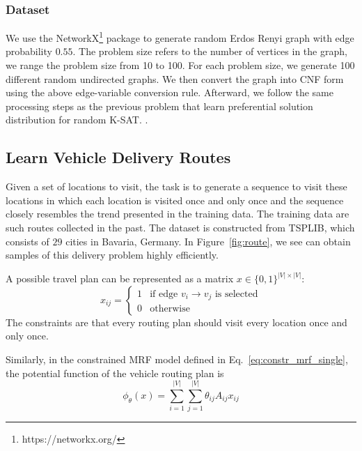 \subsubsection{Dataset} {We use the NetworkX\footnote{https://networkx.org/} package to generate random Erdos Renyi graph with edge probability $0.55$. The problem size refers to the number of vertices in the graph, we range the problem size from 10 to 100. For each problem size, we generate 100 different random undirected graphs. We then convert the graph into CNF form using the above edge-variable conversion rule. Afterward, we follow the same processing steps as the previous problem that learn preferential solution distribution for random K-SAT. }.


\subsection{Learn Vehicle Delivery Routes}
Given a set of locations to visit, the task is to generate a sequence to visit these locations in which each location is visited once and only once and the sequence closely resembles the trend presented in the training data.  The training data are such routes collected in the past.  
The dataset is constructed from TSPLIB, which consists of $29$ cities in Bavaria, Germany. 
%
In Figure~\ref{fig:route}, we see  \nls can obtain samples of this delivery problem highly efficiently. %

A possible travel plan can be represented as a matrix $x\in\{0,1\}^{|V|\times |V|}$:
\begin{equation}\label{eq:route}
x_{ij}=\begin{cases}
1& \text{if edge } v_i\to v_j \text{ is selected}\\
0&\text{otherwise}
\end{cases}
\end{equation}
The constraints are that every  routing plan should visit every location once and only once.

Similarly, in the constrained MRF model defined in Eq.~\eqref{eq:constr_mrf_single}, the potential function of the vehicle routing plan is
\begin{equation*}
 \phi_{\theta}(x)=\sum_{i=1}^{|V|}\sum_{j=1}^{|V|}\theta_{ij}A_{ij}x_{ij}
\end{equation*}


